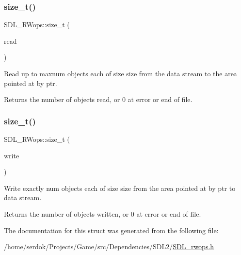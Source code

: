 \subsubsection{\texorpdfstring{size\+\_\+t()}{size\_t()}\hspace{0.1cm}{\footnotesize\ttfamily [1/2]}}
{\footnotesize\ttfamily S\+D\+L\+\_\+\+R\+Wops\+::size\+\_\+t (\begin{DoxyParamCaption}\item[{S\+D\+L\+C\+A\+LL $\ast$}]{read }\end{DoxyParamCaption})}

Read up to {\ttfamily maxnum} objects each of size {\ttfamily size} from the data stream to the area pointed at by {\ttfamily ptr}.

\begin{DoxyReturn}{Returns}
the number of objects read, or 0 at error or end of file. 
\end{DoxyReturn}
\mbox{\label{structSDL__RWops_a5f12fd517afffba5bfaff4643d6792b1}} 
\subsubsection{\texorpdfstring{size\+\_\+t()}{size\_t()}\hspace{0.1cm}{\footnotesize\ttfamily [2/2]}}
{\footnotesize\ttfamily S\+D\+L\+\_\+\+R\+Wops\+::size\+\_\+t (\begin{DoxyParamCaption}\item[{S\+D\+L\+C\+A\+LL $\ast$}]{write }\end{DoxyParamCaption})}

Write exactly {\ttfamily num} objects each of size {\ttfamily size} from the area pointed at by {\ttfamily ptr} to data stream.

\begin{DoxyReturn}{Returns}
the number of objects written, or 0 at error or end of file. 
\end{DoxyReturn}


The documentation for this struct was generated from the following file\+:\begin{DoxyCompactItemize}
\item 
/home/serdok/\+Projects/\+Game/src/\+Dependencies/\+S\+D\+L2/\hyperlink{SDL__rwops_8h}{S\+D\+L\+\_\+rwops.\+h}\end{DoxyCompactItemize}
